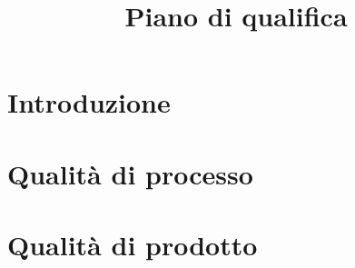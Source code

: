 \documentclass{article}
\title{Piano di qualifica}
\begin{document}


\section{Introduzione}%
\label{sec:introduzione}



\section{Qualità di processo}%
\label{sec:qualita_di_processo}



\section{Qualità di prodotto}%
\label{sec:qualita_di_prodotto}



\end{document}

